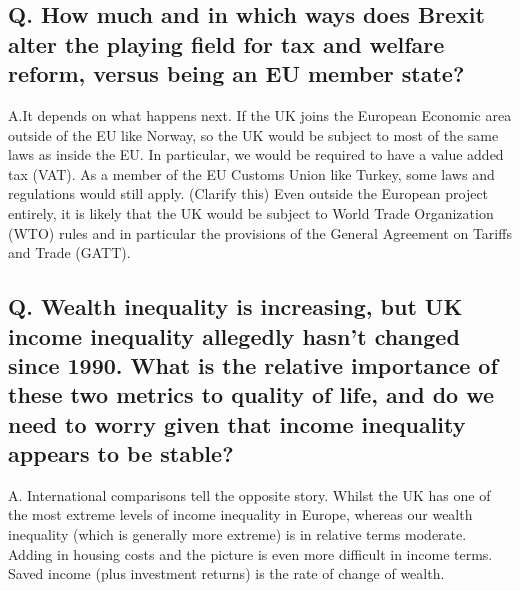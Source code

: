 \documentclass[]{tufte-handout}
\begin{document}
\hypertarget{q.-how-much-and-in-which-ways-does-brexit-alter-the-playing-field-for-tax-and-welfare-reform-versus-being-an-eu-member-state}{%
\subsection{Q. How much and in which ways does Brexit alter the playing
field for tax and welfare reform, versus being an EU member
state?}\label{q.-how-much-and-in-which-ways-does-brexit-alter-the-playing-field-for-tax-and-welfare-reform-versus-being-an-eu-member-state}}

A.It depends on what happens next. If the UK joins the European Economic
area outside of the EU like Norway, so the UK would be subject to most
of the same laws as inside the EU. In particular, we would be required
to have a value added tax (VAT). As a member of the EU Customs Union
like Turkey, some laws and regulations would still apply. (Clarify this)
Even outside the European project entirely, it is likely that the UK
would be subject to World Trade Organization (WTO) rules and in
particular the provisions of the General Agreement on Tariffs and Trade
(GATT).

\hypertarget{q.-wealth-inequality-is-increasing-but-uk-income-inequality-allegedly-hasnt-changed-since-1990.-what-is-the-relative-importance-of-these-two-metrics-to-quality-of-life-and-do-we-need-to-worry-given-that-income-inequality-appears-to-be-stable}{%
\subsection{Q. Wealth inequality is increasing, but UK income inequality
allegedly hasn't changed since 1990. What is the relative importance of
these two metrics to quality of life, and do we need to worry given that
income inequality appears to be
stable?}\label{q.-wealth-inequality-is-increasing-but-uk-income-inequality-allegedly-hasnt-changed-since-1990.-what-is-the-relative-importance-of-these-two-metrics-to-quality-of-life-and-do-we-need-to-worry-given-that-income-inequality-appears-to-be-stable}}

A. International comparisons tell the opposite story. Whilst the UK has
one of the most extreme levels of income inequality in Europe, whereas
our wealth inequality (which is generally more extreme) is in relative
terms moderate. Adding in housing costs and the picture is even more
difficult in income terms. Saved income (plus investment returns) is the
rate of change of wealth.
\end{document}
